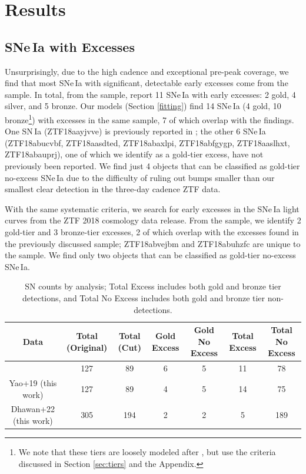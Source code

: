 \documentclass[twocolumn,twocolappendix, linenumbers]{aastex631} %
\begin{document}
\section{Results} \label{results}
\subsection{SNe\,Ia with Excesses}
 Unsurprisingly, due to the high cadence and exceptional pre-peak coverage, we find that most SNe\,Ia with significant, detectable early excesses come from the \cite{Yao19} sample.  In total, from the \cite{Yao19} sample, \cite{Burke22a} report 11 SNe\,Ia with early excesses: 2 gold, 4 silver, and 5 bronze. Our models (Section \ref{fitting}) find 14 SNe\,Ia (4 gold, 10 bronze\footnote{We note that these tiers are loosely modeled after \citet{Burke22a}, but use the criteria discussed in Section \ref{sec:tiers} and the Appendix.}) with excesses in the same sample, 7 of which overlap with the \citet{Burke22a} findings. One SN\,Ia (ZTF18aayjvve) is previously reported in \cite{Deckers22}; the other 6 SNe\,Ia (ZTF18abucvbf, ZTF18aasdted, ZTF18abaxlpi, ZTF18abfgygp, ZTF18aaslhxt, ZTF18abauprj), one of which we identify as a gold-tier excess, have not previously been reported. We find just 4 objects that can be classified as gold-tier no-excess SNe\,Ia due to the difficulty of ruling out bumps smaller than our smallest clear detection in the three-day cadence ZTF data.

With the same systematic criteria, we search for early excesses in the SNe\,Ia light curves from the ZTF 2018 cosmology data release. From the \cite{Dhawan22} sample, we identify 2 gold-tier and 3 bronze-tier excesses, 2 of which overlap with the excesses found in the previously discussed sample; ZTF18abvejbm and ZTF18abuhzfc are unique to the \citet{Dhawan22} sample. We find only two objects that can be classified as gold-tier no-excess SNe\,Ia.  

\begin{table}[ht]
\centering
\begin{tabular}{ |c|c|c|c|c|c|c|} 
 \hline
 Data & Total (Original) & Total (Cut) & Gold Excess & Gold No Excess& Total Excess & Total No Excess \\
 \hline
 \citet{Burke22b} & 127 & 89 & 6 & 5 & 11 & 78 \\
 Yao+19 (this work) & 127 & 89 & 4 & 5 & 14 & 75\\
 Dhawan+22 (this work) & 305 & 194 & 2 & 2 & 5 & 189 \\
 
 \hline
\end{tabular}
\centering
\caption{SN counts by analysis; Total Excess includes both gold and bronze tier detections, and Total No Excess includes both gold and bronze tier non-detections.}
\end{table}
\end{document}
